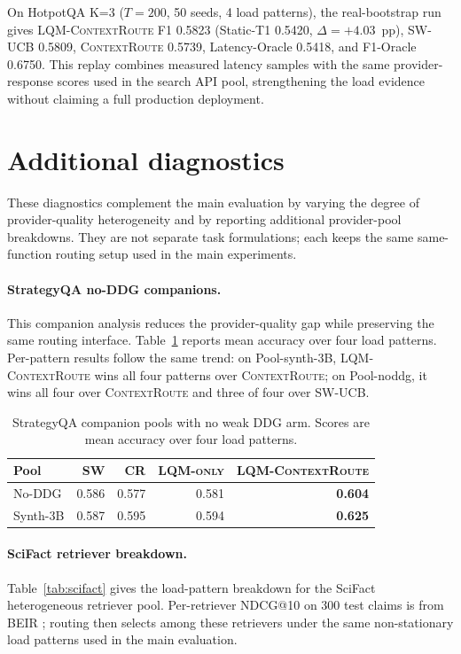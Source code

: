 \documentclass[11pt]{article}
\newcommand{\contextroute}{\textsc{ContextRoute}}
\newcommand{\swucb}{\textsc{SW-UCB}}
\newcommand{\lqm}{\textsc{LQM-only}}
\newcommand{\lqmcr}{\textsc{LQM-ContextRoute}}
\begin{document}
On HotpotQA K=3 ($T=200$, 50 seeds, 4 load patterns), the real-bootstrap run gives \lqmcr{} F1 0.5823 (Static-T1 0.5420, $\Delta=+4.03$~pp), \swucb{} 0.5809, \contextroute{} 0.5739, Latency-Oracle 0.5418, and F1-Oracle 0.6750. This replay combines measured latency samples with the same provider-response scores used in the search API pool, strengthening the load evidence without claiming a full production deployment.

\section{Additional diagnostics}
\label{app:diagnostics}

These diagnostics complement the main evaluation by varying the degree of provider-quality heterogeneity and by reporting additional provider-pool breakdowns. They are not separate task formulations; each keeps the same same-function routing setup used in the main experiments.

\paragraph{StrategyQA no-DDG companions.}
\label{app:strategyqa-noddg}
This companion analysis reduces the provider-quality gap while preserving the same routing interface. Table~\ref{tab:strategyqa-realistic} reports mean accuracy over four load patterns. Per-pattern results follow the same trend: on Pool-synth-3B, \lqmcr{} wins all four patterns over \contextroute{}; on Pool-noddg, it wins all four over \contextroute{} and three of four over \swucb{}.

\begin{table}[ht]
\centering\scriptsize
\setlength{\tabcolsep}{3pt}
\begin{tabular}{lrrrr}
\toprule
Pool & SW & CR & \lqm{} & \lqmcr{} \\
\midrule
No-DDG & 0.586 & 0.577 & 0.581 & \textbf{0.604} \\
Synth-3B & 0.587 & 0.595 & 0.594 & \textbf{0.625} \\
\bottomrule
\end{tabular}
\caption{StrategyQA companion pools with no weak DDG arm. Scores are mean
accuracy over four load patterns.}
\label{tab:strategyqa-realistic}
\end{table}

\paragraph{SciFact retriever breakdown.}
\label{app:scifact-breakdown}
Table~\ref{tab:scifact} gives the load-pattern breakdown for the SciFact heterogeneous retriever pool. Per-retriever NDCG@10 on 300 test claims is from BEIR \citep{thakur2021beir}; routing then selects among these retrievers under the same non-stationary load patterns used in the main evaluation.
\end{document}
